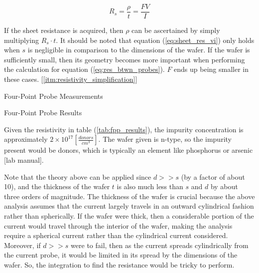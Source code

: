 \documentclass{article}
\begin{document}
\begin{equation}
\label{eq:sheet_res_vi}
R_s = \frac{\rho}{t} = \frac{ FV }{ I }
\end{equation}

If the sheet resistance is acquired, then $\rho$ can be ascertained by simply multiplying $R_s \cdot t$. It should be noted that equation (\ref{eq:sheet_res_vi}) only holds when $s$ is negligible in comparison to the dimensions of the wafer. If the wafer is sufficiently small, then its geometry becomes more important when performing the calculation for equation (\ref{eq:res_btwn_probes}). $F$ ends up being smaller in these cases. [\ref{itm:resistivity_simplification}] %


\FloatBarrier

\begin{table}[h!]
	\centering
	\caption{Four-Point Probe Measurements}
	\label{tab:fpp_measure}
\end{table}

\FloatBarrier

\begin{table}[h!]
	\centering
	\caption{Four-Point Probe Results}
	\label{tab:fpp_results}
\end{table}

\FloatBarrier

Given the resistivity in table (\ref{tab:fpp_results}), the impurity concentration is approximately $2 \times 10^{17} [\frac{donors}{cm^3}]$. The wafer given is n-type, so the impurity present would be donors, which is typically an element like phosphorus or arsenic [lab manual].

Note that the theory above can be applied since $d >> s$ (by a factor of about 10), and the thickness of the wafer $t$ is also much less than $s$ and $d$ by about three orders of magnitude. The thickness of the wafer is crucial because the above analysis assumes that the current largely travels in an outward cylindrical fashion rather than spherically. If the wafer were thick, then a considerable portion of the current would travel through the interior of the wafer, making the analysis require a spherical current rather than the cylindrical current considered. Moreover, if $d >> s$ were to fail, then as the current spreads cylindrically from the current probe, it would be limited in its spread by the dimensions of the wafer. So, the integration to find the resistance would be tricky to perform.%
\end{document}
